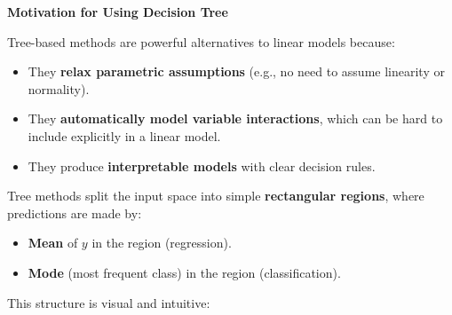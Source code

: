 \highspace
\begin{flushleft}
    \textcolor{Green3}{ \textbf{Motivation for Using Decision Tree}}
\end{flushleft}
Tree-based methods are powerful alternatives to linear models because:
\begin{itemize}[label=\textcolor{Green3}{}]
    \item They \textbf{relax parametric assumptions} (e.g., no need to assume linearity or normality).
    \item They \textbf{automatically model variable interactions}, which can be hard to include explicitly in a linear model.
    \item They produce \textbf{interpretable models} with clear decision rules.
\end{itemize}
Tree methods split the input space into simple \textbf{rectangular regions}, where predictions are made by:
\begin{itemize}
    \item \textbf{Mean} of $y$ in the region (regression).
    \item \textbf{Mode} (most frequent class) in the region (classification).
\end{itemize}
This structure is visual and intuitive:
\begin{center}
\end{center}

\newpage

